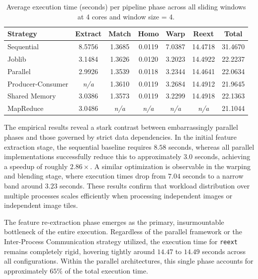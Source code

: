 \documentclass[10pt,twocolumn,letterpaper]{article}
\begin{document}
\begin{table}[htbp]
\centering
\caption{Average execution time (seconds) per pipeline phase across all sliding windows at 4 cores and window size = 4.}
\label{tab:phase_times}
\begin{tabular}{lcccccc}
\hline
\textbf{Strategy} & \textbf{Extract} & \textbf{Match} & \textbf{Homo} & \textbf{Warp} & \textbf{Reext} & \textbf{Total} \\ \hline
Sequential        & 8.5756           & 1.3685         & 0.0119        & 7.0387        & 14.4718        & 31.4670        \\
Joblib            & 3.1484           & 1.3626         & 0.0120        & 3.2023        & 14.4922        & 22.2237        \\
Parallel          & 2.9926           & 1.3539         & 0.0118        & 3.2344        & 14.4641        & 22.0634        \\
Producer-Consumer & \textit{n/a}     & 1.3610         & 0.0119        & 3.2684        & 14.4912        & 21.9645        \\
Shared Memory     & 3.0386           & 1.3573         & 0.0119        & 3.2299        & 14.4918        & 22.1363        \\
MapReduce         & 3.0486           & \textit{n/a}   & \textit{n/a}  & \textit{n/a}  & \textit{n/a}   & 21.1044        \\ \hline
\end{tabular}
\end{table}

The empirical results reveal a stark contrast between embarrassingly parallel phases and those governed by strict data dependencies. 
In the initial feature extraction stage, the sequential baseline requires $8.58$ seconds, whereas all parallel implementations successfully reduce this to approximately $3.0$ seconds, achieving a speedup of roughly $2.86\times$. 
A similar optimization is observable in the warping and blending stage, where execution times drop from $7.04$ seconds to a narrow band around $3.23$ seconds. 
These results confirm that workload distribution over multiple processes scales efficiently when processing independent images or independent image tiles.

The feature re-extraction phase emerges as the primary, 
insurmountable bottleneck of the entire execution. 
Regardless of the parallel framework or the Inter-Process Communication strategy utilized, 
the execution time for \texttt{reext} remains completely rigid, 
hovering tightly around $14.47$ to $14.49$ seconds across all configurations. 
Within the parallel architectures, this single phase accounts for approximately $65\%$ of the total execution time.
\end{document}
